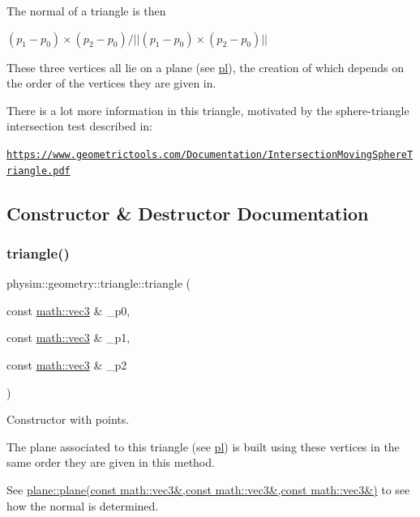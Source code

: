 The normal of a triangle is then

$ (p_1 - p_0) \times (p_2 - p_0) / || (p_1 - p_0) \times (p_2 - p_0) || $

These three vertices all lie on a plane (see \hyperlink{classphysim_1_1geometry_1_1triangle_a4fcfc136bcc0d2cdf31c37a7a71fc9f8}{pl}), the creation of which depends on the order of the vertices they are given in.

There is a lot more information in this triangle, motivated by the sphere-\/triangle intersection test described in\+:

\href{https://www.geometrictools.com/Documentation/IntersectionMovingSphereTriangle.pdf}{\tt https\+://www.\+geometrictools.\+com/\+Documentation/\+Intersection\+Moving\+Sphere\+Triangle.\+pdf} 

\subsection{Constructor \& Destructor Documentation}
\mbox{\label{classphysim_1_1geometry_1_1triangle_a4e0a11057c6297dbe03c193d52e7e212}} 
\subsubsection{\texorpdfstring{triangle()}{triangle()}}
{\footnotesize\ttfamily physim\+::geometry\+::triangle\+::triangle (\begin{DoxyParamCaption}\item[{const \hyperlink{structphysim_1_1math_1_1vec3}{math\+::vec3} \&}]{\+\_\+p0,  }\item[{const \hyperlink{structphysim_1_1math_1_1vec3}{math\+::vec3} \&}]{\+\_\+p1,  }\item[{const \hyperlink{structphysim_1_1math_1_1vec3}{math\+::vec3} \&}]{\+\_\+p2 }\end{DoxyParamCaption})}



Constructor with points. 

The plane associated to this triangle (see \hyperlink{classphysim_1_1geometry_1_1triangle_a4fcfc136bcc0d2cdf31c37a7a71fc9f8}{pl}) is built using these vertices in the same order they are given in this method.

See \hyperlink{classphysim_1_1geometry_1_1plane_a7ff5e0444f792d759198fb7339c9dc1a}{plane\+::plane(const math\+::vec3\&,const math\+::vec3\&,const math\+::vec3\&)} to see how the normal is determined. 

